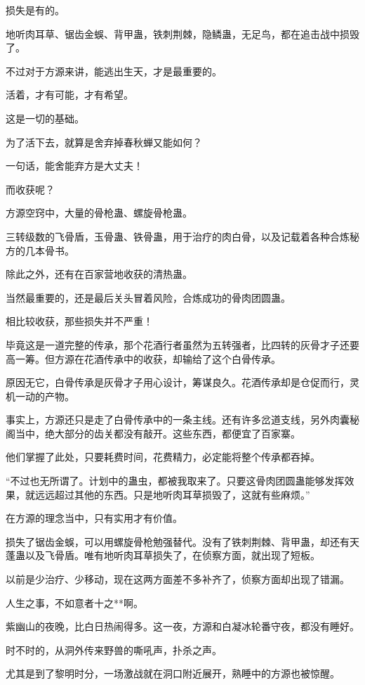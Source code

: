 \begin{this_body}
损失是有的。

地听肉耳草、锯齿金蜈、背甲蛊，铁刺荆棘，隐鳞蛊，无足鸟，都在追击战中损毁了。

不过对于方源来讲，能逃出生天，才是最重要的。

活着，才有可能，才有希望。

这是一切的基础。

为了活下去，就算是舍弃掉春秋蝉又能如何？

一句话，能舍能弃方是大丈夫！

而收获呢？

方源空窍中，大量的骨枪蛊、螺旋骨枪蛊。

三转级数的飞骨盾，玉骨蛊、铁骨蛊，用于治疗的肉白骨，以及记载着各种合炼秘方的几本骨书。

除此之外，还有在百家营地收获的清热蛊。

当然最重要的，还是最后关头冒着风险，合炼成功的骨肉团圆蛊。

相比较收获，那些损失并不严重！

毕竟这是一道完整的传承，那个花酒行者虽然为五转强者，比四转的灰骨才子还要高一筹。但方源在花酒传承中的收获，却输给了这个白骨传承。

原因无它，白骨传承是灰骨才子用心设计，筹谋良久。花酒传承却是仓促而行，灵机一动的产物。

事实上，方源还只是走了白骨传承中的一条主线。还有许多岔道支线，另外肉囊秘阁当中，绝大部分的齿关都没有敲开。这些东西，都便宜了百家寨。

他们掌握了此处，只要耗费时间，花费精力，必定能将整个传承都吞掉。

“不过也无所谓了。计划中的蛊虫，都被我取来了。只要这骨肉团圆蛊能够发挥效果，就远远超过其他的东西。只是地听肉耳草损毁了，这就有些麻烦。”

在方源的理念当中，只有实用才有价值。

损失了锯齿金蜈，可以用螺旋骨枪勉强替代。没有了铁刺荆棘、背甲蛊，却还有天蓬蛊以及飞骨盾。唯有地听肉耳草损失了，在侦察方面，就出现了短板。

以前是少治疗、少移动，现在这两方面差不多补齐了，侦察方面却出现了错漏。

人生之事，不如意者十之**啊。

紫幽山的夜晚，比白日热闹得多。这一夜，方源和白凝冰轮番守夜，都没有睡好。

时不时的，从洞外传来野兽的嘶吼声，扑杀之声。

尤其是到了黎明时分，一场激战就在洞口附近展开，熟睡中的方源也被惊醒。


\end{this_body}
